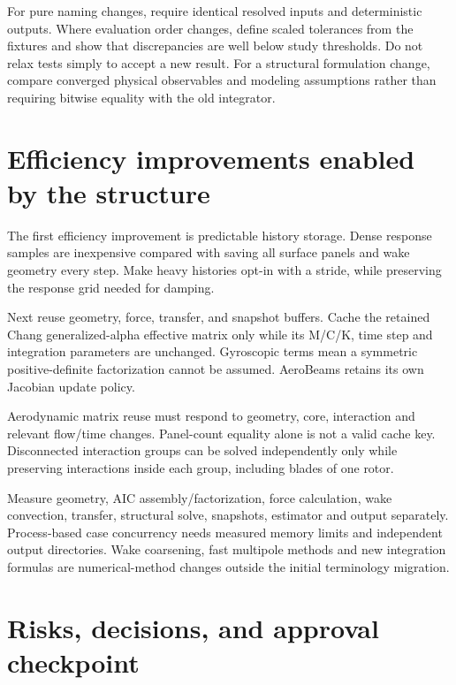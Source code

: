 \documentclass[11pt,a4paper]{article}
\begin{document}
For pure naming changes, require identical resolved inputs and deterministic
outputs. Where evaluation order changes, define scaled tolerances from the
fixtures and show that discrepancies are well below study thresholds.
Do not relax tests simply to accept a new result. For a structural formulation
change, compare converged physical observables and modeling assumptions rather
than requiring bitwise equality with the old integrator.

\section{Efficiency improvements enabled by the structure}

The first efficiency improvement is predictable history storage. Dense
response samples are inexpensive compared with saving all surface panels and
wake geometry every step. Make heavy histories opt-in with a stride, while
preserving the response grid needed for damping.

Next reuse geometry, force, transfer, and snapshot buffers. Cache the retained
Chang generalized-alpha effective matrix only while its M/C/K, time step and
integration parameters are unchanged. Gyroscopic terms mean a symmetric
positive-definite factorization cannot be assumed. AeroBeams retains its own
Jacobian update policy.

Aerodynamic matrix reuse must respond to geometry, core, interaction and
relevant flow/time changes. Panel-count equality alone is not a valid cache
key. Disconnected interaction groups can be solved independently only while
preserving interactions inside each group, including blades of one rotor.

Measure geometry, AIC assembly/factorization, force calculation, wake
convection, transfer, structural solve, snapshots, estimator and output
separately. Process-based case concurrency needs measured memory limits and
independent output directories. Wake coarsening, fast multipole methods and
new integration formulas are numerical-method changes outside the initial
terminology migration.

\section{Risks, decisions, and approval checkpoint}
\label{sec:approval}
\end{document}
